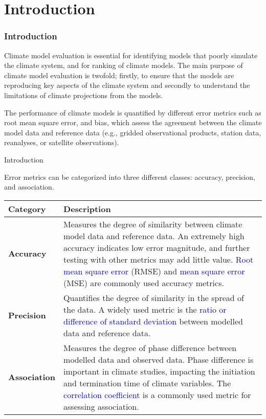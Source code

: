 \documentclass[xcolor={dvipsnames}]{beamer}
\begin{document}
\section{Introduction}

\begin{frame}
\frametitle{Introduction}

Climate model evaluation is essential for identifying models that poorly simulate the climate system, and for ranking of climate models. The main purpose of climate model evaluation is twofold; firstly, to ensure that the models are reproducing key aspects of the climate system and secondly to understand the limitations of climate projections from the models. \newline

\pause

The performance of climate models is quantified by different error metrics such as root mean square error, and bias, which assess the agreement between the climate model data and reference data (e.g., gridded observational products, station data, reanalyses, or satellite observations).

\end{frame}

\begin{frame}{Introduction}

Error metrics can be categorized into three different classes: accuracy, precision, and association.

\begin{table}[h]
\footnotesize
\centering
\begin{tabular}{|>{\centering\arraybackslash}m{2cm}|>{\raggedright\arraybackslash}m{8cm}|}
\hline
\textbf{Category} & \textbf{Description} \\
\hline
\textbf{Accuracy} & Measures the degree of similarity between climate model data and reference data. An extremely high accuracy indicates low error magnitude, and further testing with other metrics may add little value. \textcolor{blue}{Root mean square error} (RMSE) and \textcolor{blue}{mean square error} (MSE) are commonly used accuracy metrics. \\
\hline
\textbf{Precision} & Quantifies the degree of similarity in the spread of the data. A widely used metric is the \textcolor{blue}{ratio or difference of standard deviation} between modelled data and reference data. \\
\hline
\textbf{Association} & Measures the degree of phase difference between modelled data and observed data. Phase difference is important in climate studies, impacting the initiation and termination time of climate variables. The \textcolor{blue}{correlation coefficient} is a commonly used metric for assessing association. \\
\hline
\end{tabular}
\end{table}
    
\end{frame}
\end{document}
